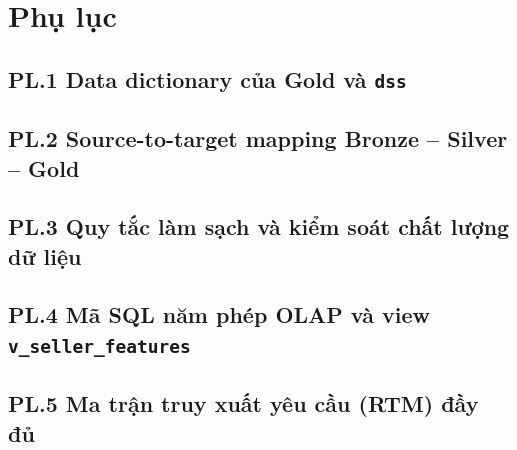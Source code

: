 \documentclass[a4paper]{article}
\begin{document}
\newpage
{}
{}
\section*{Phụ lục}

\label{pl:1}
\subsection*{PL.1 Data dictionary của Gold và \texttt{dss}}

\label{pl:2}
\subsection*{PL.2 Source-to-target mapping Bronze -- Silver -- Gold}

\label{pl:3}
\subsection*{PL.3 Quy tắc làm sạch và kiểm soát chất lượng dữ liệu}

\label{pl:4}
\subsection*{PL.4 Mã SQL năm phép OLAP và view \texttt{v\_seller\_features}}

\label{pl:5}
\subsection*{PL.5 Ma trận truy xuất yêu cầu (RTM) đầy đủ}
\end{document}
